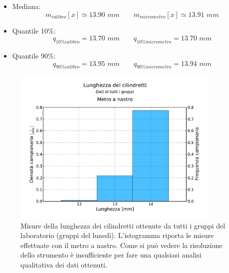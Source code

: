 \begin{itemize}
    \item{Mediana:}
        \begin{equation}
        m_{calibro}[x] \simeq 13.90\,\,mm \qquad
        m_{micrometro}[x] \simeq 13.91\,\,mm 
        \end{equation}

    \item{Quantile 10\%:}
        \begin{equation}
        q_{10\%calibro} = 13.70\,\,mm \qquad
        q_{10\%micrometro} = 13.70\,\,mm
        \end{equation}

    \item{Quantile 90\%:}
        \begin{equation}
        q_{90\%calibro} = 13.95\,\,mm \qquad
        q_{90\%micrometro} = 13.94\,\,mm
        \end{equation}
\end{itemize}

\begin{figure}
	\centering
	\includegraphics[width=100mm]{grafici/cilindri_tutti.pdf}
	\caption{Misure della lunghezza dei cilindretti ottenute da tutti i gruppi del
        laboratorio (gruppi del lunedì). L'istogramma riporta le misure effettuate con
        il metro a nastro. Come si può vedere la risoluzione dello strumento è
        insufficiente per fare una qualsiasi analisi qualitativa dei dati ottenuti.}
\end{figure}


